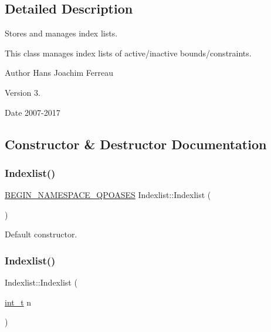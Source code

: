 \subsection{Detailed Description}
Stores and manages index lists. 

This class manages index lists of active/inactive bounds/constraints.

\begin{DoxyAuthor}{Author}
Hans Joachim Ferreau 
\end{DoxyAuthor}
\begin{DoxyVersion}{Version}
3. 
\end{DoxyVersion}
\begin{DoxyDate}{Date}
2007-\/2017 
\end{DoxyDate}


\subsection{Constructor \& Destructor Documentation}
\mbox{\label{class_indexlist_ae8912418954f7d3988b45e61ae3e1792}} 
\subsubsection{\texorpdfstring{Indexlist()}{Indexlist()}\hspace{0.1cm}{\footnotesize\ttfamily [1/3]}}
{\footnotesize\ttfamily \hyperlink{_types_8hpp_afd127fcb3c8f47975e9fa0ec2bacde52}{B\+E\+G\+I\+N\+\_\+\+N\+A\+M\+E\+S\+P\+A\+C\+E\+\_\+\+Q\+P\+O\+A\+S\+ES} Indexlist\+::\+Indexlist (\begin{DoxyParamCaption}{ }\end{DoxyParamCaption})}

Default constructor. \mbox{\label{class_indexlist_aa8c9a7435650a1f0d6690fa14ff033dc}} 
\subsubsection{\texorpdfstring{Indexlist()}{Indexlist()}\hspace{0.1cm}{\footnotesize\ttfamily [2/3]}}
{\footnotesize\ttfamily Indexlist\+::\+Indexlist (\begin{DoxyParamCaption}\item[{\hyperlink{_types_8hpp_ab6fd6105e64ed14a0c9281326f05e623}{int\+\_\+t}}]{n }\end{DoxyParamCaption})}

